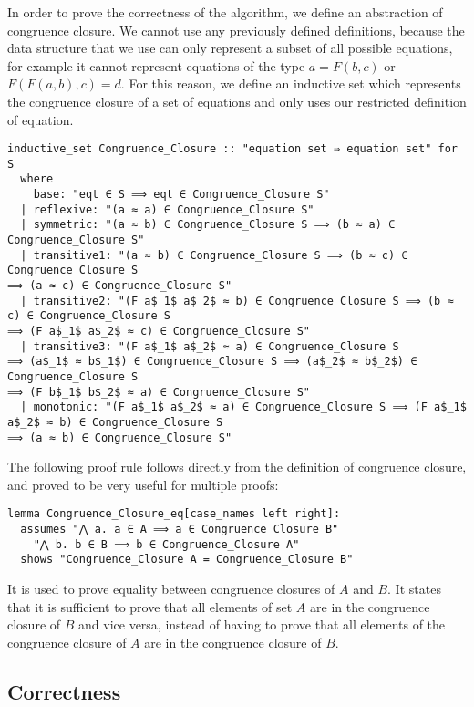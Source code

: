 In order to prove the correctness of the algorithm, we define an abstraction of congruence closure. We cannot use any previously defined definitions, because the data structure that we use can only represent a subset of all possible equations, for example it cannot represent equations of the type $a = F(b, c)$ or $F (F (a, b), c) = d$. For this reason, we define an inductive set which represents the congruence closure of a set of equations and only uses our restricted definition of equation.

\begin{lstlisting}
inductive_set Congruence_Closure :: "equation set ⇒ equation set" for S
  where
    base: "eqt ∈ S ⟹ eqt ∈ Congruence_Closure S"
  | reflexive: "(a ≈ a) ∈ Congruence_Closure S"
  | symmetric: "(a ≈ b) ∈ Congruence_Closure S ⟹ (b ≈ a) ∈ Congruence_Closure S"
  | transitive1: "(a ≈ b) ∈ Congruence_Closure S ⟹ (b ≈ c) ∈ Congruence_Closure S
⟹ (a ≈ c) ∈ Congruence_Closure S"
  | transitive2: "(F a$_1$ a$_2$ ≈ b) ∈ Congruence_Closure S ⟹ (b ≈ c) ∈ Congruence_Closure S
⟹ (F a$_1$ a$_2$ ≈ c) ∈ Congruence_Closure S"
  | transitive3: "(F a$_1$ a$_2$ ≈ a) ∈ Congruence_Closure S
⟹ (a$_1$ ≈ b$_1$) ∈ Congruence_Closure S ⟹ (a$_2$ ≈ b$_2$) ∈ Congruence_Closure S
⟹ (F b$_1$ b$_2$ ≈ a) ∈ Congruence_Closure S"
  | monotonic: "(F a$_1$ a$_2$ ≈ a) ∈ Congruence_Closure S ⟹ (F a$_1$ a$_2$ ≈ b) ∈ Congruence_Closure S
⟹ (a ≈ b) ∈ Congruence_Closure S"
\end{lstlisting}

The following proof rule follows directly from the definition of congruence closure, and proved to be very useful for multiple proofs:

\begin{lstlisting}
lemma Congruence_Closure_eq[case_names left right]:
  assumes "⋀ a. a ∈ A ⟹ a ∈ Congruence_Closure B"
    "⋀ b. b ∈ B ⟹ b ∈ Congruence_Closure A"
  shows "Congruence_Closure A = Congruence_Closure B"
\end{lstlisting}

It is used to prove equality between congruence closures of $A$ and $B$. It states that it is sufficient to prove that all elements of set $A$ are in the congruence closure of $B$ and vice versa, instead of having to prove that all elements of the congruence closure of $A$ are in the congruence closure of $B$.

\subsection{Correctness}

